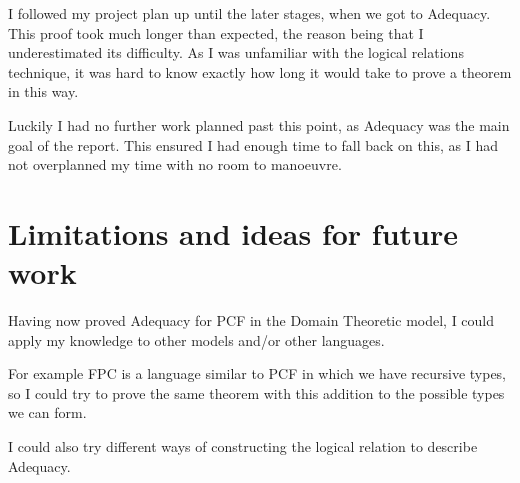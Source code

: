 I followed my project plan up until the later stages, when we got to Adequacy. This proof took much longer than expected, the reason being that I underestimated its difficulty. As I was unfamiliar with the logical relations technique, it was hard to know exactly how long it would take to  prove a theorem in this way.

 Luckily I had no further work planned past this point, as Adequacy was the main goal of the report. This ensured I had enough time to fall back on this, as I had not overplanned my time with no room to manoeuvre. 

\section{Limitations and ideas for future work}
Having now proved Adequacy for PCF in the Domain Theoretic model, I could apply my knowledge to other models and/or other languages.


For example FPC is a language similar to PCF in which we have recursive types, so I could try to prove the same theorem with this addition to the possible types we can form.

I could also try different ways of constructing the logical relation to describe Adequacy.






